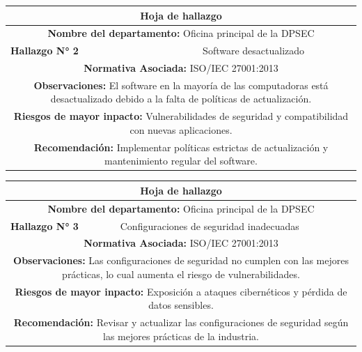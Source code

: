 \documentclass[12pt,a4paper]{article}
\begin{document}
    \begin{tabular}{ |p{4cm}|p{4cm}|p{4cm}|  }
        \hline  
        \multicolumn{3}{|c|}{\textbf{Hoja de hallazgo}} \\
        \hline
        \multicolumn{3}{|c|}{\textbf{Nombre del departamento: } Oficina principal de la DPSEC} \\
        \hline
        \textbf{Hallazgo N° 2}  & \multicolumn{2}{|c|}{ Software desactualizado } \\
        \hline
        \multicolumn{3}{|c|}{\textbf{Normativa Asociada: }  ISO/IEC 27001:2013 } \\
        \hline
        \multicolumn{3}{|c|}{\textbf{Observaciones: } El software en la mayoría de las computadoras está desactualizado debido a la falta de políticas de actualización.} \\
        \hline
        \multicolumn{3}{|c|}{\textbf{Riesgos de mayor inpacto: }  Vulnerabilidades de seguridad y compatibilidad con nuevas aplicaciones.} \\
        \hline
        \multicolumn{3}{|c|}{\textbf{Recomendación: } Implementar políticas estrictas de actualización y mantenimiento regular del software. } \\
        \hline
    \end{tabular}
    \par
    \begin{tabular}{ |p{4cm}|p{4cm}|p{4cm}|  }
        \hline  
        \multicolumn{3}{|c|}{\textbf{Hoja de hallazgo}} \\
        \hline
        \multicolumn{3}{|c|}{\textbf{Nombre del departamento: } Oficina principal de la DPSEC} \\
        \hline
        \textbf{Hallazgo N° 3}  & \multicolumn{2}{|l|}{ Configuraciones de seguridad inadecuadas } \\
        \hline
        \multicolumn{3}{|c|}{\textbf{Normativa Asociada: }  ISO/IEC 27001:2013} \\
        \hline
        \multicolumn{3}{|c|}{\textbf{Observaciones: } Las configuraciones de seguridad no cumplen con las mejores prácticas, lo cual aumenta el riesgo de vulnerabilidades.} \\
        \hline
        \multicolumn{3}{|c|}{\textbf{Riesgos de mayor inpacto: }  Exposición a ataques cibernéticos y pérdida de datos sensibles.} \\
        \hline
        \multicolumn{3}{|c|}{\textbf{Recomendación: } Revisar y actualizar las configuraciones de seguridad según las mejores prácticas de la industria. } \\
        \hline
    \end{tabular}
\end{document}
